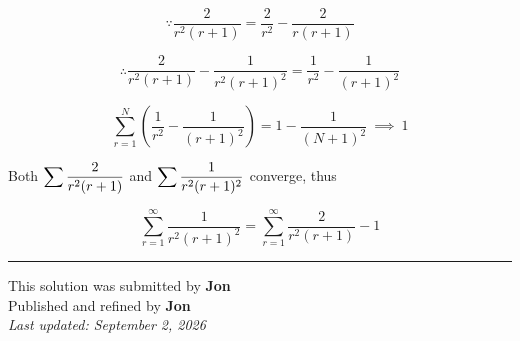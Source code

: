 \documentclass[12pt]{article}
\begin{document}
$$\because \frac2{r^2(r+1)}=\frac2{r^2}-\frac2{r(r+1)}$$

$$\therefore \frac2{r^2(r+1)}-\frac1{r^2(r+1)^2}=\frac1{r^2}-\frac1{(r+1)^2}$$

$$\sum_{r=1}^N\left(\frac1{r^2}-\frac1{(r+1)^2}\right)=1-\frac1{(N+1)^2}\ \implies\ 1$$

Both $\displaystyle \sum\frac2{r^2(r+1)}$ and $\displaystyle \sum\frac1{r^2(r+1)^2}$ converge, thus

$$\boxed{\sum_{r=1}^\infty\frac1{r^2(r+1)^2}
=\sum_{r=1}^\infty\frac2{r^2(r+1)}-1}$$

\bigskip
\hrule
\begin{center}
    This solution was submitted by \textbf{Jon}\\[4pt]
    Published and refined by \textbf{Jon}\\[8pt]
    \textit{Last updated: September 2, 2026}
\end{center}
\end{document}
